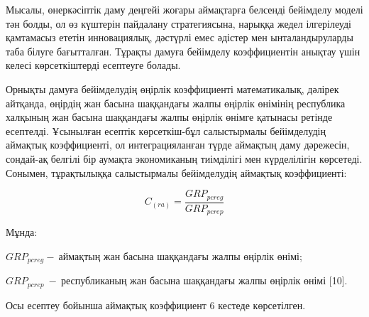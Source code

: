 \begin{multicols}{2}
Мысалы, өнеркәсіптік даму деңгейі жоғары аймақтарға белсенді бейімделу
моделі тән болды, ол өз күштерін пайдалану стратегиясына, нарыққа жедел
ілгерілеуді қамтамасыз ететін инновациялық, дәстүрлі емес әдістер мен
ынталандыруларды таба білуге бағытталған. Тұрақты дамуға бейімделу
коэффициентін анықтау үшін келесі көрсеткіштерді есептеуге болады.

Орнықты дамуға бейімделудің өңірлік коэффициенті математикалық, дәлірек
айтқанда, өңірдің жан басына шаққандағы жалпы өңірлік өнімінің
республика халқының жан басына шаққандағы жалпы өңірлік өнімге қатынасы
ретінде есептелді. Ұсынылған есептік көрсеткіш-бұл салыстырмалы
бейімделудің аймақтық коэффициенті, ол интеграцияланған түрде аймақтың
даму дәрежесін, сондай-ақ белгілі бір аумақта экономиканың тиімділігі
мен күрделілігін көрсетеді. Сонымен, тұрақтылыққа салыстырмалы
бейімделудің аймақтық коэффициенті:

\[C_{(ra)} = \frac{{GRP}_{pcreg}}{{GRP}_{pcrep}}\]

Мұнда:

\({GRP}_{pcreg} - \ аймақтың\) жан басына шаққандағы жалпы өңірлік
өнімі;

\({GRP}_{pcrep}\  - \ \)республиканың жан басына шаққандағы жалпы
өңірлік өнімі {[}10{]}.

Осы есептеу бойынша аймақтық коэффициент 6 кестеде көрсетілген.
\end{multicols}

